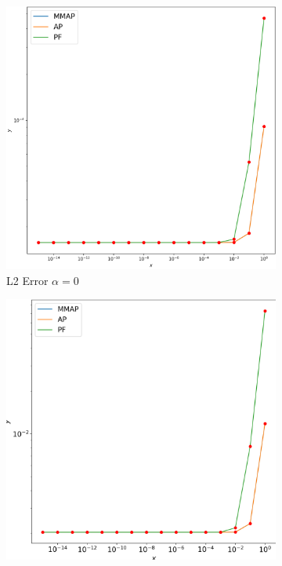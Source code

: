 \documentclass[12pt]{ociamthesis}
\begin{document}
\begin{figure}[H]
 \begin{subfigure}{0.44\textwidth}
     \includegraphics[width=\textwidth]{Pics/LHSims/E1a_MMAP_AP_PFL2.png}
     \caption{L2 Error $\alpha=0$}
 \end{subfigure}
   \begin{subfigure}{0.44\textwidth}
     \includegraphics[width=\textwidth]{Pics/LHSims/E1a_MMAP_AP_PFH1.png}

\end{subfigure}
\end{figure}
\end{document}
